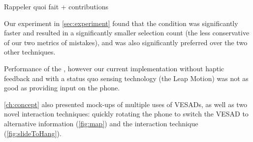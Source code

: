 Rappeler quoi fait + contributions

Our experiment in \autoref{sec:experiment} found that the  condition was significantly faster and resulted in a significantly smaller selection count (the less conservative of our two metrics of mistakes), and was also significantly preferred over the two other techniques.

Performance of the , however our current implementation without haptic feedback and with a status quo sensing technology (the Leap Motion) was not as good as providing input on the phone.

\autoref{ch:concept} also presented mock-ups of multiple uses of VESADs, as well as two novel interaction techniques: quickly rotating the phone to switch the VESAD to alternative information (\autoref{fig:map}) and the  interaction technique (\autoref{fig:slideToHang}).